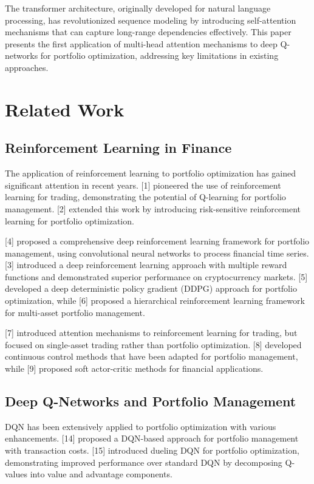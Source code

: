 \documentclass[11pt]{article}
\begin{document}
The transformer architecture, originally developed for natural language processing, has revolutionized sequence modeling by introducing self-attention mechanisms that can capture long-range dependencies effectively. This paper presents the first application of multi-head attention mechanisms to deep Q-networks for portfolio optimization, addressing key limitations in existing approaches.

\section{Related Work}

\subsection{Reinforcement Learning in Finance}

The application of reinforcement learning to portfolio optimization has gained significant attention in recent years. [1] pioneered the use of reinforcement learning for trading, demonstrating the potential of Q-learning for portfolio management. [2] extended this work by introducing risk-sensitive reinforcement learning for portfolio optimization.

[4] proposed a comprehensive deep reinforcement learning framework for portfolio management, using convolutional neural networks to process financial time series. [3] introduced a deep reinforcement learning approach with multiple reward functions and demonstrated superior performance on cryptocurrency markets. [5] developed a deep deterministic policy gradient (DDPG) approach for portfolio optimization, while [6] proposed a hierarchical reinforcement learning framework for multi-asset portfolio management.

[7] introduced attention mechanisms to reinforcement learning for trading, but focused on single-asset trading rather than portfolio optimization. [8] developed continuous control methods that have been adapted for portfolio management, while [9] proposed soft actor-critic methods for financial applications.

\subsection{Deep Q-Networks and Portfolio Management}

DQN has been extensively applied to portfolio optimization with various enhancements. [14] proposed a DQN-based approach for portfolio management with transaction costs. [15] introduced dueling DQN for portfolio optimization, demonstrating improved performance over standard DQN by decomposing Q-values into value and advantage components.
\end{document}

